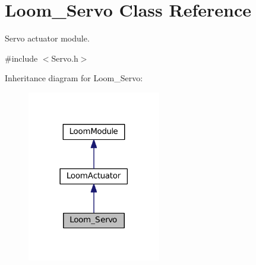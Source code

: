 \hypertarget{class_loom___servo}{}\section{Loom\+\_\+\+Servo Class Reference}
\label{class_loom___servo}


Servo actuator module.  




{\ttfamily \#include $<$Servo.\+h$>$}



Inheritance diagram for Loom\+\_\+\+Servo\+:\nopagebreak
\begin{figure}[H]
\begin{center}
\leavevmode
\includegraphics[width=165pt]{class_loom___servo__inherit__graph}
\end{center}
\end{figure}

